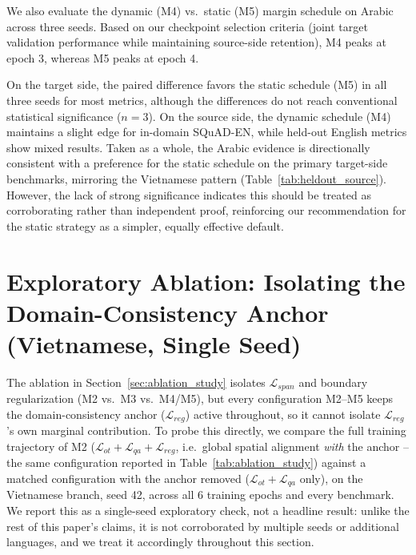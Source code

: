 \documentclass[11pt]{article}
\begin{document}
We also evaluate the dynamic (M4) vs.\ static (M5) margin schedule on Arabic across three seeds. Based on our checkpoint selection criteria (joint target validation performance while maintaining source-side retention), M4 peaks at epoch 3, whereas M5 peaks at epoch 4.

On the target side, the paired difference favors the static schedule (M5) in all three seeds for most metrics, although the differences do not reach conventional statistical significance ($n=3$). On the source side, the dynamic schedule (M4) maintains a slight edge for in-domain SQuAD-EN, while held-out English metrics show mixed results. Taken as a whole, the Arabic evidence is directionally consistent with a preference for the static schedule on the primary target-side benchmarks, mirroring the Vietnamese pattern (Table~\ref{tab:heldout_source}). However, the lack of strong significance indicates this should be treated as corroborating rather than independent proof, reinforcing our recommendation for the static strategy as a simpler, equally effective default.

\section{Exploratory Ablation: Isolating the Domain-Consistency Anchor (Vietnamese, Single Seed)}
\label{sec:appendix_reg_ablation}
The ablation in Section~\ref{sec:ablation_study} isolates $\mathcal{L}_{span}$ and boundary regularization (M2 vs.\ M3 vs.\ M4/M5), but every configuration M2--M5 keeps the domain-consistency anchor ($\mathcal{L}_{reg}$) active throughout, so it cannot isolate $\mathcal{L}_{reg}$'s own marginal contribution. To probe this directly, we compare the full training trajectory of M2 ($\mathcal{L}_{ot}+\mathcal{L}_{qa}+\mathcal{L}_{reg}$, i.e.\ global spatial alignment \emph{with} the anchor -- the same configuration reported in Table~\ref{tab:ablation_study}) against a matched configuration with the anchor removed ($\mathcal{L}_{ot}+\mathcal{L}_{qa}$ only), on the Vietnamese branch, seed 42, across all 6 training epochs and every benchmark. We report this as a single-seed exploratory check, not a headline result: unlike the rest of this paper's claims, it is not corroborated by multiple seeds or additional languages, and we treat it accordingly throughout this section.
\end{document}
